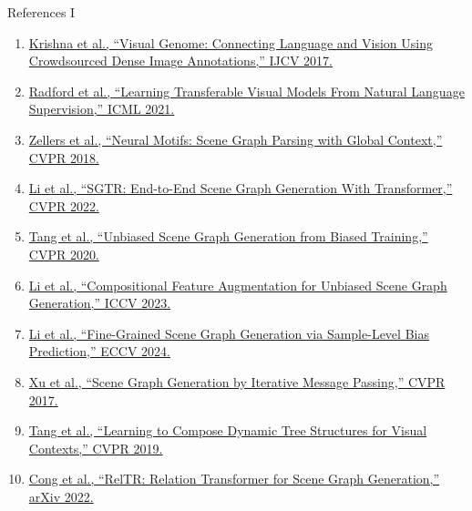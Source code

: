 \documentclass[aspectratio=1610]{beamer}
\begin{document}
\begin{frame}{References I}
\footnotesize
\begin{enumerate}
  \item \href{https://link.springer.com/article/10.1007/s11263-016-0981-7}{Krishna et al., ``Visual Genome: Connecting Language and Vision Using Crowdsourced Dense Image Annotations,'' IJCV 2017.}
  \item \href{https://arxiv.org/abs/2103.00020}{Radford et al., ``Learning Transferable Visual Models From Natural Language Supervision,'' ICML 2021.}
  \item \href{https://openaccess.thecvf.com/content_cvpr_2018/html/Zellers_Neural_Motifs_Scene_CVPR_2018_paper.html}{Zellers et al., ``Neural Motifs: Scene Graph Parsing with Global Context,'' CVPR 2018.}
  \item \href{https://openaccess.thecvf.com/content/CVPR2022/papers/Li_SGTR_End-to-End_Scene_Graph_Generation_With_Transformer_CVPR_2022_paper.pdf}{Li et al., ``SGTR: End-to-End Scene Graph Generation With Transformer,'' CVPR 2022.}
  \item \href{https://openaccess.thecvf.com/content_cvpr_2020/html/Tang_Unbiased_Scene_Graph_Generation_From_Biased_Training_CVPR_2020_paper.html}{Tang et al., ``Unbiased Scene Graph Generation from Biased Training,'' CVPR 2020.}
  \item \href{https://openaccess.thecvf.com/content/ICCV2023/html/Li_Compositional_Feature_Augmentation_for_Unbiased_Scene_Graph_Generation_ICCV_2023_paper.html}{Li et al., ``Compositional Feature Augmentation for Unbiased Scene Graph Generation,'' ICCV 2023.}
  \item \href{https://eccv.ecva.net/virtual/2024/poster/2253}{Li et al., ``Fine-Grained Scene Graph Generation via Sample-Level Bias Prediction,'' ECCV 2024.}
  \item \href{https://openaccess.thecvf.com/content_cvpr_2017/html/Xu_Scene_Graph_Generation_CVPR_2017_paper.html}{Xu et al., ``Scene Graph Generation by Iterative Message Passing,'' CVPR 2017.}
  \item \href{https://openaccess.thecvf.com/content_CVPR_2019/html/Tang_Learning_to_Compose_Dynamic_Tree_Structures_for_Visual_Contexts_CVPR_2019_paper.html}{Tang et al., ``Learning to Compose Dynamic Tree Structures for Visual Contexts,'' CVPR 2019.}
  \item \href{https://arxiv.org/abs/2201.11460}{Cong et al., ``RelTR: Relation Transformer for Scene Graph Generation,'' arXiv 2022.}
\end{enumerate}
\end{frame}
\end{document}
